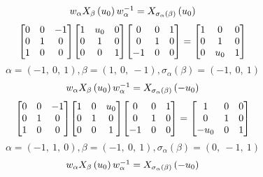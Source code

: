 \documentclass[11pt]{article}
\theoremstyle{definition}
\begin{document}
\[
\scaletoalign{\textwidth}{w_{\alpha} X_{\beta}\left(u_{0}\right) w_{\alpha}^{-1} = X_{\sigma_{\alpha}\left(\beta\right)}\left(u_{0}\right)}
\]
\[
\scaletoalign{\textwidth}{{\left[\begin{matrix}0 & 0 & -1\\0 & 1 & 0\\1 & 0 & 0\end{matrix}\right]} {\left[\begin{matrix}1 & u_{0} & 0\\0 & 1 & 0\\0 & 0 & 1\end{matrix}\right]} {\left[\begin{matrix}0 & 0 & 1\\0 & 1 & 0\\-1 & 0 & 0\end{matrix}\right]} = {\left[\begin{matrix}1 & 0 & 0\\0 & 1 & 0\\0 & u_{0} & 1\end{matrix}\right]}}
\]
\[
\alpha = \left( -1, \  0, \  1\right), \beta = \left( 1, \  0, \  -1\right), \sigma_{\alpha}(\beta) = \left( -1, \  0, \  1\right)
\]
\[
\scaletoalign{\textwidth}{w_{\alpha} X_{\beta}\left(u_{0}\right) w_{\alpha}^{-1} = X_{\sigma_{\alpha}\left(\beta\right)}\left(- u_{0}\right)}
\]
\[
\scaletoalign{\textwidth}{{\left[\begin{matrix}0 & 0 & -1\\0 & 1 & 0\\1 & 0 & 0\end{matrix}\right]} {\left[\begin{matrix}1 & 0 & u_{0}\\0 & 1 & 0\\0 & 0 & 1\end{matrix}\right]} {\left[\begin{matrix}0 & 0 & 1\\0 & 1 & 0\\-1 & 0 & 0\end{matrix}\right]} = {\left[\begin{matrix}1 & 0 & 0\\0 & 1 & 0\\- u_{0} & 0 & 1\end{matrix}\right]}}
\]
\[
\alpha = \left( -1, \  1, \  0\right), \beta = \left( -1, \  0, \  1\right), \sigma_{\alpha}(\beta) = \left( 0, \  -1, \  1\right)
\]
\[
\scaletoalign{\textwidth}{w_{\alpha} X_{\beta}\left(u_{0}\right) w_{\alpha}^{-1} = X_{\sigma_{\alpha}\left(\beta\right)}\left(- u_{0}\right)}
\]
\end{document}
